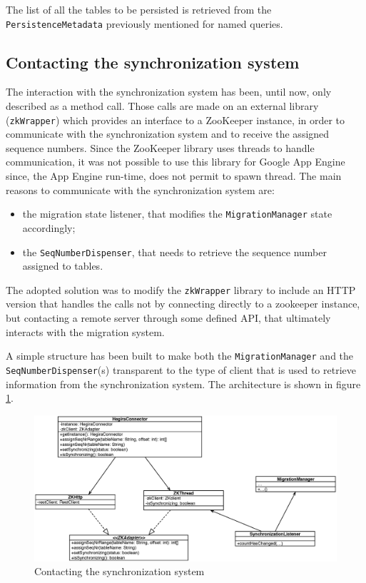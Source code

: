 \noindent The list of all the tables to be persisted is retrieved from the \texttt{PersistenceMetadata} previously mentioned for named queries.
 
\subsection{Contacting the synchronization system}
The interaction with the synchronization system has been, until now, only described as a method call. Those calls are made on an external library (\texttt{zkWrapper}) which provides an interface to a ZooKeeper instance, in order to communicate with the synchronization system and to receive the assigned sequence numbers.
Since the ZooKeeper library uses threads to handle communication, it was not possible to use this library for Google App Engine since, the App Engine run-time, does not permit to spawn thread.
The main reasons to communicate with the synchronization system are:
\begin{itemize}
\item the migration state listener, that modifies the \texttt{MigrationManager} state accordingly;
\item the \texttt{SeqNumberDispenser}, that needs to retrieve the sequence number assigned to tables.
\end{itemize} 
\noindent The adopted solution was to modify the \texttt{zkWrapper} library to include an HTTP version that handles the calls not by connecting directly to a zookeeper instance, but contacting a remote server through some defined API, that ultimately interacts with the migration system.

\newparagraph A simple structure has been built to make both the \texttt{MigrationManager} and the \texttt{SeqNumberDispenser}(s) transparent to the type of client that is used to retrieve information from the synchronization system. The architecture is shown in figure \ref{fig:zk-adapter}.

\begin{figure}[tbh]
  \centering
  \includegraphics[width=14cm]{images/zk_adapter}
  \caption{Contacting the synchronization system}
  \label{fig:zk-adapter}
\end{figure} 

